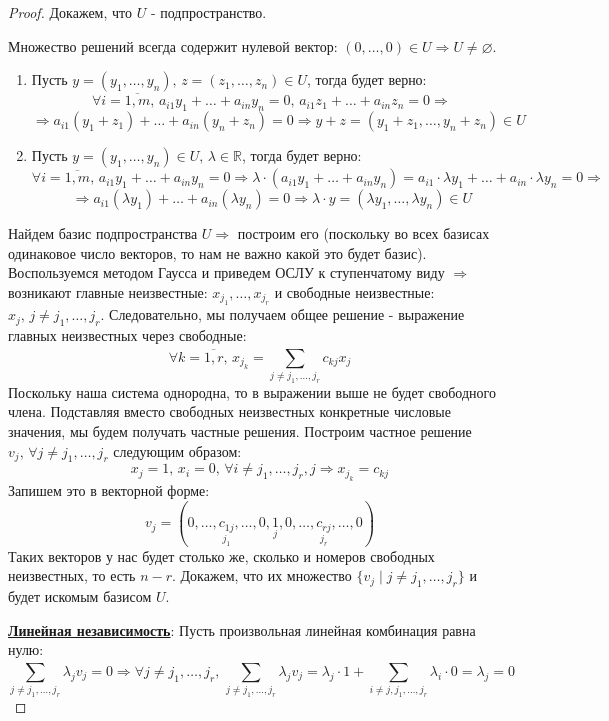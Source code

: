 \documentclass[12pt]{article}
\newcommand{\MR}{\mathbb{R}}
\newcommand{\VN}{\varnothing}
\theoremstyle{definition}
\newcommand{\ddsum}[2]{\displaystyle\sum\limits_{#1}^{#2}}
\begin{document}
\begin{proof}
	Докажем, что $U$ - подпространство. 
	
	Множество решений всегда содержит нулевой вектор: $(0, \dotsc, 0) \in U \Rightarrow U \neq \VN$.
	\begin{enumerate}[label=\arabic*)]
		\item Пусть $y = (y_1, \dotsc, y_n), \, z = (z_1, \dotsc, z_n) \in U$, тогда будет верно:
		$$
			\forall i = \overline{1,m}, \, a_{i1}y_1 + \dotsc + a_{in} y_n = 0, \, a_{i1}z_1 + \dotsc + a_{in} z_n = 0 \Rightarrow 
		$$
		$$
			\Rightarrow a_{i1}(y_1 + z_1)  + \dotsc + a_{in} (y_n + z_n) = 0 \Rightarrow y + z = (y_1 + z_1, \dotsc , y_n  + z_n) \in U
		$$
		\item Пусть $y = (y_1, \dotsc, y_n) \in U, \, \lambda \in \MR$, тогда будет верно:
		$$
			\forall i = \overline{1,m}, \, a_{i1}y_1 + \dotsc + a_{in} y_n = 0 \Rightarrow \lambda{\cdot}(a_{i1}y_1 + \dotsc + a_{in} y_n) = a_{i1}{\cdot} \lambda y_1 + \dotsc + a_{in} {\cdot} \lambda y_n = 0 \Rightarrow 
		$$
		$$
			\Rightarrow a_{i1}(\lambda y_1) + \dotsc + a_{in}(\lambda y_n) = 0 \Rightarrow\lambda {\cdot}y = (\lambda y_1 ,\dotsc, \lambda y_n) \in U 
		$$
	\end{enumerate}
	Найдем базис подпространства $U \Rightarrow$ построим его (поскольку во всех базисах одинаковое число векторов, то нам не важно какой это будет базис). Воспользуемся методом Гаусса и приведем ОСЛУ к ступенчатому виду $\Rightarrow$ возникают главные неизвестные: $x_{j_1}, \dotsc, x_{j_r}$ и свободные неизвестные: $x_j, \, j \neq j_1,\dotsc, j_r$. Следовательно, мы получаем общее решение - выражение главных неизвестных через свободные:
	$$
		\forall k = \overline{1,r}, \, x_{j_k} = \ddsum{j \neq j_1, \dotsc, j_r}{}c_{kj}x_j
	$$
	Поскольку наша система однородна, то в выражении выше не будет свободного члена. Подставляя вместо свободных неизвестных конкретные числовые значения, мы будем получать частные решения. 	
	Построим частное решение $v_j, \, \forall j \neq j_1,\dotsc,j_r$ следующим образом:
	$$
		x_j = 1, \, x_i = 0, \, \forall i \neq j_1, \dotsc, j_r, j \Rightarrow x_{j_k} = c_{kj}
	$$ 
	Запишем это в векторной форме:
	$$
		v_j = (0, \dotsc, \underset{j_1}{c_{1j}},  \dotsc,0, \underset{j}{1}, 0, \dotsc, \underset{j_r}{c_{rj}}, \dotsc, 0)
	$$
	Таких векторов у нас будет столько же, сколько и номеров свободных неизвестных, то есть  $n - r$. Докажем, что их множество $\{v_j \mid j \neq j_1 ,\dotsc, j_r\}$ и будет искомым базисом $U$.
	
	\uline{\textbf{Линейная независимость}}: Пусть произвольная линейная комбинация равна нулю:
	$$
		\ddsum{j \neq j_1, \dotsc, j_r}{}\lambda_j v_j = 0 \Rightarrow \forall j \neq j_1, \dotsc, j_r,\, \ddsum{j \neq j_1, \dotsc, j_r}{}\lambda_j v_j = \lambda_j {\cdot}1 + \ddsum{i \neq j, j_1,\dotsc, j_r}{}\lambda_{i}{\cdot}0 = \lambda_j = 0
	$$
	

\end{proof}
\end{document}
